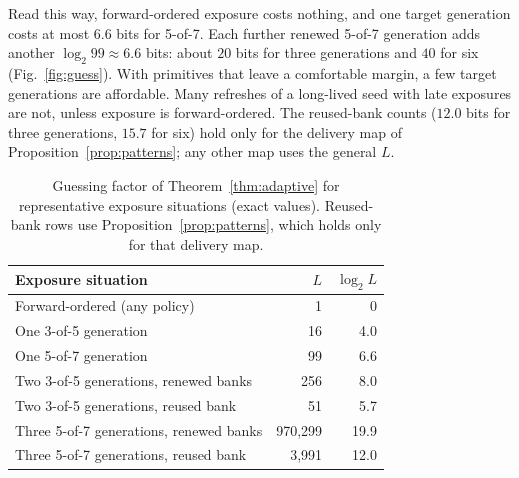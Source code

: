 \documentclass[pdflatex,sn-mathphys-num]{sn-jnl}%
\theoremstyle{plain}
\theoremstyle{definition}
\begin{document}
Read this way, forward-ordered exposure costs nothing, and one target generation costs at most $6.6$ bits for 5-of-7. Each further renewed 5-of-7 generation adds another $\log_2 99\approx6.6$ bits: about $20$ bits for three generations and $40$ for six (Fig.~\ref{fig:guess}). With primitives that leave a comfortable margin, a few target generations are affordable. Many refreshes of a long-lived seed with late exposures are not, unless exposure is forward-ordered. The reused-bank counts ($12.0$ bits for three generations, $15.7$ for six) hold only for the delivery map of Proposition~\ref{prop:patterns}; any other map uses the general $L$.

\begin{table}[htbp]
\caption{Guessing factor of Theorem~\ref{thm:adaptive} for representative exposure situations (exact values). Reused-bank rows use Proposition~\ref{prop:patterns}, which holds only for that delivery map.}\label{tab:guess}
\centering\footnotesize
\begin{tabularx}{\linewidth}{@{}>{\raggedright\arraybackslash}Xrr@{}}\toprule
Exposure situation & $L$ & $\log_2L$\\\midrule
Forward-ordered (any policy) & 1 & 0\\
One 3-of-5 generation & 16 & 4.0\\
One 5-of-7 generation & 99 & 6.6\\
Two 3-of-5 generations, renewed banks & 256 & 8.0\\
Two 3-of-5 generations, reused bank & 51 & 5.7\\
Three 5-of-7 generations, renewed banks & 970,299 & 19.9\\
Three 5-of-7 generations, reused bank & 3,991 & 12.0\\\bottomrule
\end{tabularx}
\end{table}
\end{document}
